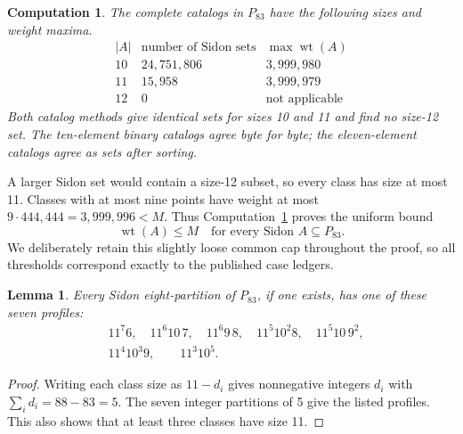 \documentclass[11pt]{article}
\newtheorem{lemma}[theorem]{Lemma}
\newtheorem{computation}[theorem]{Computation}
\newcommand{\wt}{\operatorname{wt}}
\newcommand{\PP}{P_{83}}
\begin{document}
\begin{table}[ht]
\centering

\caption{The 42 independent entries of the weight vector. Set
$u_{82-x}=u_x$ for the remaining entries.}\label{tab:weights}
\end{table}

\begin{computation}\label{comp:catalogs}
The complete catalogs in $\PP$ have the following sizes and weight maxima.
\[
\begin{array}{c|r|r}
 |A|&\text{number of Sidon sets}&\max\wt(A)\\\hline
 10&24{,}751{,}806&3{,}999{,}980\\
 11&15{,}958&3{,}999{,}979\\
 12&0&\text{not applicable}
\end{array}
\]
Both catalog methods give identical sets for sizes 10 and 11 and find
no size-12 set. The ten-element binary catalogs agree byte for byte;
the eleven-element catalogs agree as sets after sorting.
\end{computation}

A larger Sidon set would contain a size-12 subset, so every class has
size at most 11. Classes with at most nine points have weight at most
$9\cdot444{,}444=3{,}999{,}996<M$. Thus Computation~\ref{comp:catalogs}
proves the uniform bound
\begin{equation}\label{eq:cap}
                   \wt(A)\leq M\quad\text{for every Sidon }A\subseteq\PP.
\end{equation}
We deliberately retain this slightly loose common cap throughout the
proof, so all thresholds correspond exactly to the published case ledgers.

\begin{lemma}\label{lem:profiles}
Every Sidon eight-partition of $\PP$, if one exists, has one of these
seven profiles:
\begin{align*}
&11^7 6,\quad 11^6 10\,7,\quad 11^6 9\,8,\quad
 11^5 10^2 8,\quad 11^5 10\,9^2,\\
&11^4 10^3 9,\qquad 11^3 10^5.
\end{align*}
\end{lemma}
\begin{proof}
Writing each class size as $11-d_i$ gives nonnegative integers $d_i$
with $\sum_i d_i=88-83=5$. The seven integer partitions of 5 give the
listed profiles. This also shows that at least three classes have size 11.
\end{proof}
\end{document}

